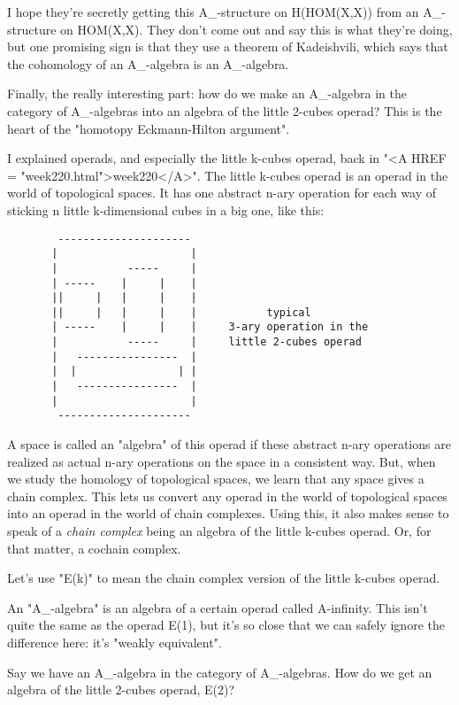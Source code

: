 I hope they're secretly getting this A_{\infty }-structure on 
H(HOM(X,X)) from an A_{\infty }-structure on HOM(X,X).  They don't
come out and say this is what they're doing, but one promising 
sign is that they use a theorem of Kadeishvili, which says that 
the cohomology of an A_{\infty }-algebra is an A_{\infty }-algebra.  

Finally, the really interesting part: how do we make an
A_{\infty }-algebra in the category of
A_{\infty }-algebras into an algebra of the little 2-cubes
operad?  This is the heart of the "homotopy Eckmann-Hilton argument".

I explained operads, and especially the little k-cubes operad, back in
"<A HREF = "week220.html">week220</A>".  The little k-cubes
operad is an operad in the world of topological spaces.  It has one
abstract n-ary operation for each way of sticking n little
k-dimensional cubes in a big one, like this:

\begin{verbatim}
        ---------------------
       |                     |
       |           -----     |
       | -----    |     |    | 
       ||     |   |     |    |
       ||     |   |     |    |           typical  
       | -----    |     |    |     3-ary operation in the       
       |           -----     |     little 2-cubes operad
       |   ----------------  |
       |  |                | |
       |   ----------------  |
       |                     |
        ---------------------
\end{verbatim}
    

A space is called an "algebra" of this operad if these abstract 
n-ary operations are realized as actual n-ary operations on the 
space in a consistent way.  But, when we study the homology 
of topological spaces, we learn that any space gives a chain complex.
This lets us convert any operad in the world of topological spaces 
into an operad in the world of chain complexes.  Using this, it also 
makes sense to speak of a \emph{chain complex} being an algebra of the
little k-cubes operad.  Or, for that matter, a cochain complex.

Let's use "E(k)" to mean the chain complex version of the little 
k-cubes operad.  

An "A_{\infty }-algebra" is an algebra of a certain
operad called A-infinity.  This isn't quite the same as the operad
E(1), but it's so close that we can safely ignore the difference here:
it's "weakly equivalent".

Say we have an A_{\infty }-algebra in the category of A_{\infty }-algebras.  How do we get an algebra of the little 2-cubes operad,
E(2)?

